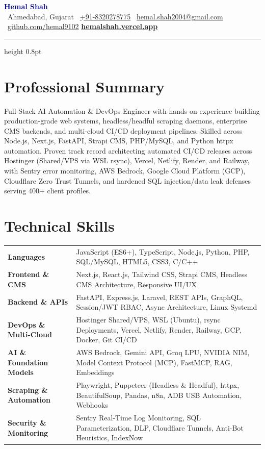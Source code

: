 \documentclass[10.5pt]{article}
\newcommand{\faMapMarker}{{\small\textbullet}}
\newcommand{\faPhone}{{\small\textbullet}}
\newcommand{\faEnvelope}{{\small\textbullet}}
\newcommand{\faGithub}{{\small\textbullet}}
\begin{document}
\begin{center}
{\Huge \textbf{\textcolor{darkblue}{Hemal Shah}}} \\[4pt]
{\small\color{medgray}
\faMapMarker\ Ahmedabad, Gujarat \quad
\faPhone\ \href{tel:+918320278775}{+91-8320278775} \quad
\faEnvelope\ \href{mailto:hemal.shah2004@gmail.com}{hemal.shah2004@gmail.com} \quad
\faGithub\ \href{https://github.com/hemal9102}{github.com/hemal9102} \quad
\href{https://hemalshah.vercel.app}{\textbf{hemalshah.vercel.app}}
}
\end{center}

\vspace{-3pt}
{\color{borderblue}\hrule height 0.8pt}
\vspace{3pt}

\section*{Professional Summary}
{\small
Full-Stack AI Automation \& DevOps Engineer with hands-on experience building production-grade web systems, headless/headful scraping daemons, enterprise CMS backends, and multi-cloud CI/CD deployment pipelines. Skilled across Node.js, Next.js, FastAPI, Strapi CMS, PHP/MySQL, and Python httpx automation. Proven track record architecting automated CI/CD releases across Hostinger (Shared/VPS via WSL rsync), Vercel, Netlify, Render, and Railway, with Sentry error monitoring, AWS Bedrock, Google Cloud Platform (GCP), Cloudflare Zero Trust Tunnels, and hardened SQL injection/data leak defenses serving 400+ client profiles.
}

\section*{Technical Skills}
{\small
\begin{tabularx}{\textwidth}{@{}>{\bfseries\color{darkblue}}l@{\quad}X@{}}
Languages & JavaScript (ES6+), TypeScript, Node.js, Python, PHP, SQL/MySQL, HTML5, CSS3, C/C++ \\[1.5pt]
Frontend \& CMS & Next.js, React.js, Tailwind CSS, Strapi CMS, Headless CMS Architecture, Responsive UI/UX \\[1.5pt]
Backend \& APIs & FastAPI, Express.js, Laravel, REST APIs, GraphQL, Session/JWT RBAC, Async Architecture, Linux Systemd \\[1.5pt]
DevOps \& Multi-Cloud & Hostinger Shared/VPS, WSL (Ubuntu), rsync Deployments, Vercel, Netlify, Render, Railway, GCP, Docker, Git CI/CD \\[1.5pt]
AI \& Foundation Models & AWS Bedrock, Gemini API, Groq LPU, NVIDIA NIM, Model Context Protocol (MCP), FastMCP, RAG, Embeddings \\[1.5pt]
Scraping \& Automation & Playwright, Puppeteer (Headless \& Headful), httpx, BeautifulSoup, Pandas, n8n, ADB USB Automation, Webhooks \\[1.5pt]
Security \& Monitoring & Sentry Real-Time Log Monitoring, SQL Parameterization, DLP, Cloudflare Tunnels, Anti-Bot Heuristics, IndexNow \\
\end{tabularx}
}
\end{document}

